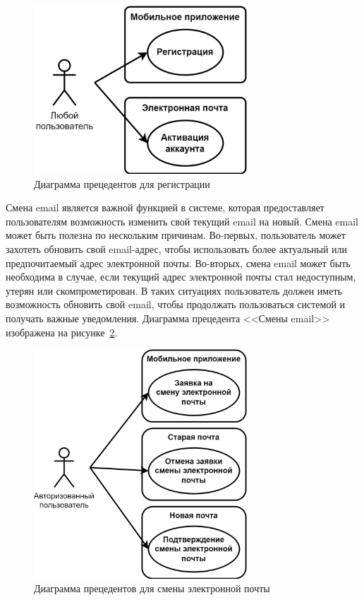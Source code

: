\begin{figure}[!htb]
    \centering

    \includegraphics[width=8cm]
    {images/UML/UML_precedent_registration.png}

    \caption{Диаграмма прецедентов для регистрации}

    \label{fig:UML_precedent_registration}
\end{figure}

Смена email является важной функцией в системе,
которая предоставляет пользователям возможность изменить свой текущий email на новый.
Смена email может быть полезна по нескольким причинам.
Во-первых, пользователь может захотеть обновить свой email-адрес,
чтобы использовать более актуальный или предпочитаемый адрес электронной почты.
Во-вторых, смена email может быть необходима в случае, если текущий адрес электронной почты стал недоступным,
утерян или скомпрометирован.
В таких ситуациях пользователь должен иметь возможность обновить свой email,
чтобы продолжать пользоваться системой и получать важные уведомления.
Диаграмма прецедента <<Смены email>> изображена на рисунке~\ref{fig:UML_precedent_change_email}.

\begin{figure}[!htb]
    \centering

    \includegraphics[width=8cm]
    {images/UML/UML_precedent_change_email.png}

    \caption{Диаграмма прецедентов для смены электронной почты}

    \label{fig:UML_precedent_change_email}
\end{figure}

